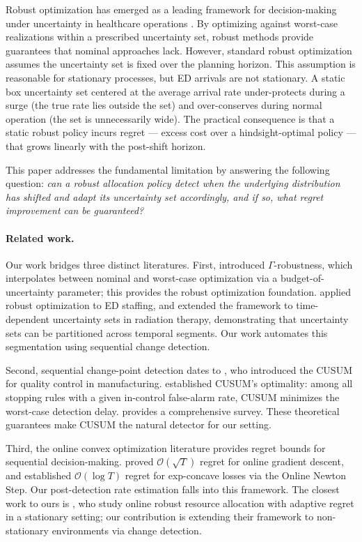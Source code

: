 \documentclass[11pt,twocolumn]{article}
\theoremstyle{plain}
\theoremstyle{definition}
\begin{document}
Robust optimization has emerged as a leading framework for decision-making under uncertainty in healthcare operations \cite{bertsimas2004price,bental2009robust,chan2016robust}. By optimizing against worst-case realizations within a prescribed uncertainty set, robust methods provide guarantees that nominal approaches lack. However, standard robust optimization assumes the uncertainty set is fixed over the planning horizon. This assumption is reasonable for stationary processes, but ED arrivals are not stationary. A static box uncertainty set centered at the average arrival rate under-protects during a surge (the true rate lies outside the set) and over-conserves during normal operation (the set is unnecessarily wide). The practical consequence is that a static robust policy incurs regret --- excess cost over a hindsight-optimal policy --- that grows linearly with the post-shift horizon.

This paper addresses the fundamental limitation by answering the following question: \emph{can a robust allocation policy detect when the underlying distribution has shifted and adapt its uncertainty set accordingly, and if so, what regret improvement can be guaranteed?}

\paragraph{Related work.} Our work bridges three distinct literatures. First, \citet{bertsimas2004price} introduced $\Gamma$-robustness, which interpolates between nominal and worst-case optimization via a budget-of-uncertainty parameter; this provides the robust optimization foundation. \citet{chan2016robust} applied robust optimization to ED staffing, and \citet{nohadani2017robust} extended the framework to time-dependent uncertainty sets in radiation therapy, demonstrating that uncertainty sets can be partitioned across temporal segments. Our work automates this segmentation using sequential change detection.

Second, sequential change-point detection dates to \citet{page1954continuous}, who introduced the CUSUM for quality control in manufacturing. \citet{lorden1971procedures,moustakides1986optimal} established CUSUM's optimality: among all stopping rules with a given in-control false-alarm rate, CUSUM minimizes the worst-case detection delay. \citet{lai1995sequential} provides a comprehensive survey. These theoretical guarantees make CUSUM the natural detector for our setting.

Third, the online convex optimization literature provides regret bounds for sequential decision-making. \citet{zinkevich2003online} proved $\mathcal{O}(\sqrt{T})$ regret for online gradient descent, and \citet{hazan2007logarithmic} established $\mathcal{O}(\log T)$ regret for exp-concave losses via the Online Newton Step. Our post-detection rate estimation falls into this framework. The closest work to ours is \citet{golrezaei2026online}, who study online robust resource allocation with adaptive regret in a stationary setting; our contribution is extending their framework to non-stationary environments via change detection.
\end{document}

